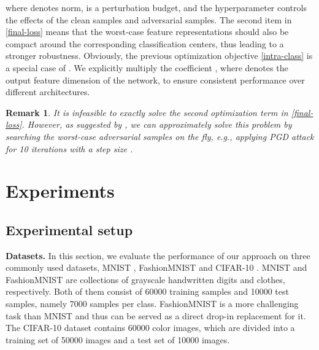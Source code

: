 \documentclass[preprint,review,12pt]{elsarticle}
\newtheorem{rmrk}{Remark}
\numberwithin{equation}{section}
\begin{document}
where   denotes  norm,   is a perturbation budget,
and the hyperparameter   controls the effects of the clean samples and adversarial samples.
The second item in \eqref{final-loss} means that the worst-case feature representations should also be compact around the corresponding classification centers,
thus leading to  a stronger robustness.
Obviously, the previous optimization objective \eqref{intra-class} is a special case of .
We explicitly multiply the coefficient ,
where  denotes the output feature  dimension of the network,
 to ensure consistent performance over different architectures.

\begin{rmrk}
	It is infeasible to exactly solve the second optimization term in \eqref{final-loss}.
	However, as suggested by \cite{madry2018,zhang2019b},
    we can approximately solve this problem by searching the worst-case adversarial samples on the fly,
    e.g., applying PGD attack for 10 iterations with a step size .
\end{rmrk}





\section{Experiments}

\subsection{Experimental setup}

\textbf{Datasets.} In this section, we evaluate the performance of our approach on three commonly used datasets,
MNIST \cite{lecun1998}, FashionMNIST \cite{fmnist2017} and CIFAR-10 \cite{krizhevsky2009}.
MNIST and FashionMNIST are collections of grayscale handwritten digits and clothes, respectively.
Both of them consist of 60000 training samples and 10000 test samples, namely 7000  samples per class.
FashionMNIST is a more challenging task than MNIST and thus can be served as a direct drop-in replacement for it.
The CIFAR-10 dataset contains 60000  color images, which are divided into a training set of 50000 images and a test set of 10000 images.


\begin{table}[htb]
	\caption{The basic setup for adversarial attacks in ,  and  norms.}
	\label{table-settings}
	\centering
\end{table}
\end{document}
